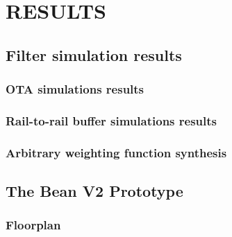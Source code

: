 \chapter{RESULTS}
\label{chapter:results}
\section{Filter simulation results}
\subsection{OTA simulations results}
\subsection{Rail-to-rail buffer simulations results}
\subsection{Arbitrary weighting function synthesis}
\section{The Bean V2 Prototype}
\subsection{Floorplan}